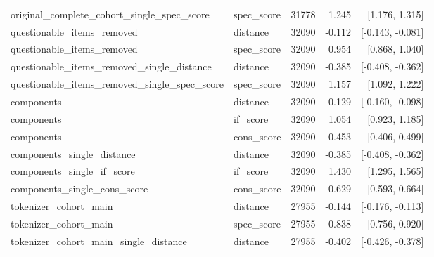 \begin{longtable}{p{3.7cm}p{2.1cm}rrr}
original\_\allowbreak{}complete\_\allowbreak{}cohort\_\allowbreak{}single\_\allowbreak{}spec\_\allowbreak{}score & spec\_\allowbreak{}score & 31778 & 1.245 & [1.176, 1.315]\\

questionable\_\allowbreak{}items\_\allowbreak{}removed & distance & 32090 & -0.112 & [-0.143, -0.081]\\

questionable\_\allowbreak{}items\_\allowbreak{}removed & spec\_\allowbreak{}score & 32090 & 0.954 & [0.868, 1.040]\\

questionable\_\allowbreak{}items\_\allowbreak{}removed\_\allowbreak{}single\_\allowbreak{}distance & distance & 32090 & -0.385 & [-0.408, -0.362]\\

questionable\_\allowbreak{}items\_\allowbreak{}removed\_\allowbreak{}single\_\allowbreak{}spec\_\allowbreak{}score & spec\_\allowbreak{}score & 32090 & 1.157 & [1.092, 1.222]\\

components & distance & 32090 & -0.129 & [-0.160, -0.098]\\

components & if\_\allowbreak{}score & 32090 & 1.054 & [0.923, 1.185]\\

components & cons\_\allowbreak{}score & 32090 & 0.453 & [0.406, 0.499]\\

components\_\allowbreak{}single\_\allowbreak{}distance & distance & 32090 & -0.385 & [-0.408, -0.362]\\

components\_\allowbreak{}single\_\allowbreak{}if\_\allowbreak{}score & if\_\allowbreak{}score & 32090 & 1.430 & [1.295, 1.565]\\

components\_\allowbreak{}single\_\allowbreak{}cons\_\allowbreak{}score & cons\_\allowbreak{}score & 32090 & 0.629 & [0.593, 0.664]\\

tokenizer\_\allowbreak{}cohort\_\allowbreak{}main & distance & 27955 & -0.144 & [-0.176, -0.113]\\

tokenizer\_\allowbreak{}cohort\_\allowbreak{}main & spec\_\allowbreak{}score & 27955 & 0.838 & [0.756, 0.920]\\

tokenizer\_\allowbreak{}cohort\_\allowbreak{}main\_\allowbreak{}single\_\allowbreak{}distance & distance & 27955 & -0.402 & [-0.426, -0.378]\\


\end{longtable}
